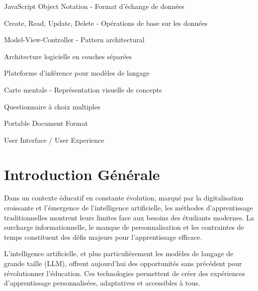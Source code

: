 \documentclass[12pt,a4paper]{report}
\begin{document}
\begin{description}[leftmargin=4cm, style=nextline]
    \item[JSON] JavaScript Object Notation - Format d'échange de données
    
    \item[CRUD] Create, Read, Update, Delete - Opérations de base sur les données
    
    \item[MVC] Model-View-Controller - Pattern architectural
    
    \item[Clean Architecture] Architecture logicielle en couches séparées
    
    \item[Groq] Plateforme d'inférence pour modèles de langage
    
    \item[Mind Map] Carte mentale - Représentation visuelle de concepts
    
    \item[Quiz] Questionnaire à choix multiples
    
    \item[PDF] Portable Document Format
    
    \item[UI/UX] User Interface / User Experience
\end{description}

\newpage

\tableofcontents
\listoffigures
\listoftables

\chapter*{Introduction Générale}

Dans un contexte éducatif en constante évolution, marqué par la digitalisation croissante et l'émergence de l'intelligence artificielle, les méthodes d'apprentissage traditionnelles montrent leurs limites face aux besoins des étudiants modernes. La surcharge informationnelle, le manque de personnalisation et les contraintes de temps constituent des défis majeurs pour l'apprentissage efficace.

L'intelligence artificielle, et plus particulièrement les modèles de langage de grande taille (LLM), offrent aujourd'hui des opportunités sans précédent pour révolutionner l'éducation. Ces technologies permettent de créer des expériences d'apprentissage personnalisées, adaptatives et accessibles à tous.
\end{document}
